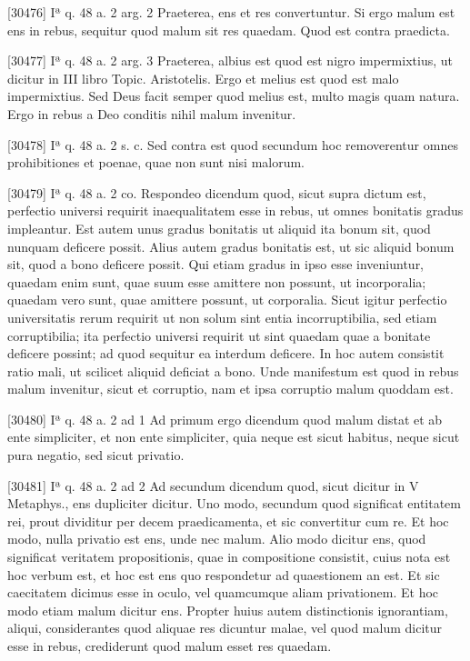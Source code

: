 \documentclass[10pt]{jsarticle} %
\begin{document}
[30476] Iª q. 48 a. 2 arg. 2 Praeterea, ens et res convertuntur. Si ergo malum est ens in rebus, sequitur quod malum sit res quaedam. Quod est contra praedicta.

[30477] Iª q. 48 a. 2 arg. 3 Praeterea, albius est quod est nigro impermixtius, ut dicitur in III libro Topic. Aristotelis. Ergo et melius est quod est malo impermixtius. Sed Deus facit semper quod melius est, multo magis quam natura. Ergo in rebus a Deo conditis nihil malum invenitur.

[30478] Iª q. 48 a. 2 s. c. Sed contra est quod secundum hoc removerentur omnes prohibitiones et poenae, quae non sunt nisi malorum.

[30479] Iª q. 48 a. 2 co. Respondeo dicendum quod, sicut supra dictum est, perfectio universi requirit inaequalitatem esse in rebus, ut omnes bonitatis gradus impleantur. Est autem unus gradus bonitatis ut aliquid ita bonum sit, quod nunquam deficere possit. Alius autem gradus bonitatis est, ut sic aliquid bonum sit, quod a bono deficere possit. Qui etiam gradus in ipso esse inveniuntur, quaedam enim sunt, quae suum esse amittere non possunt, ut incorporalia; quaedam vero sunt, quae amittere possunt, ut corporalia. Sicut igitur perfectio universitatis rerum requirit ut non solum sint entia incorruptibilia, sed etiam corruptibilia; ita perfectio universi requirit ut sint quaedam quae a bonitate deficere possint; ad quod sequitur ea interdum deficere. In hoc autem consistit ratio mali, ut scilicet aliquid deficiat a bono. Unde manifestum est quod in rebus malum invenitur, sicut et corruptio, nam et ipsa corruptio malum quoddam est.

[30480] Iª q. 48 a. 2 ad 1 Ad primum ergo dicendum quod malum distat et ab ente simpliciter, et non ente simpliciter, quia neque est sicut habitus, neque sicut pura negatio, sed sicut privatio.

[30481] Iª q. 48 a. 2 ad 2 Ad secundum dicendum quod, sicut dicitur in V Metaphys., ens dupliciter dicitur. Uno modo, secundum quod significat entitatem rei, prout dividitur per decem praedicamenta, et sic convertitur cum re. Et hoc modo, nulla privatio est ens, unde nec malum. Alio modo dicitur ens, quod significat veritatem propositionis, quae in compositione consistit, cuius nota est hoc verbum est, et hoc est ens quo respondetur ad quaestionem an est. Et sic caecitatem dicimus esse in oculo, vel quamcumque aliam privationem. Et hoc modo etiam malum dicitur ens. Propter huius autem distinctionis ignorantiam, aliqui, considerantes quod aliquae res dicuntur malae, vel quod malum dicitur esse in rebus, crediderunt quod malum esset res quaedam.
\end{document}
